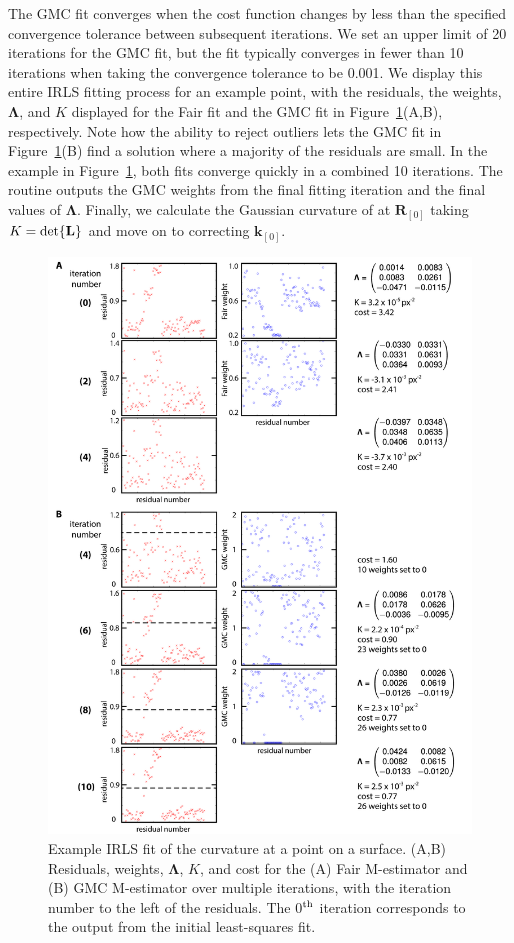 The GMC fit converges when the cost function changes by less than the specified convergence tolerance between subsequent iterations.
We set an upper limit of 20 iterations for the GMC fit, but the fit typically converges in fewer than 10 iterations when taking the convergence tolerance to be 0.001.
We display this entire IRLS fitting process for an example point, with the residuals, the weights, $\bm{\Lambda}$, and $K$ displayed for the Fair fit and the GMC fit in Figure~\ref{f:3-IRLSexample}(A,B), respectively.
Note how the ability to reject outliers lets the GMC fit in Figure~\ref{f:3-IRLSexample}(B) find a solution where a majority of the residuals are small.
In the example in Figure~\ref{f:3-IRLSexample}, both fits converge quickly in a combined 10 iterations.
The routine outputs the GMC weights from the final fitting iteration and the final values of $\bm{\Lambda}$.
Finally, we calculate the Gaussian curvature of at $\mathbf{R}_{[0]}$ taking $K = \textup{det}\{ \mathbf{L} \}$ and move on to correcting $\mathbf{k}_{[0]}$.
\begin{figure}[H]
  \centering
  \includegraphics[scale=0.95]{figures/C3/Ch3-Figs_IRLSexample.png}
  \caption{Example IRLS fit of the curvature at a point on a surface.
  (A,B) Residuals, weights, $\bm{\Lambda}$, $K$, and cost for the (A) Fair M-estimator and (B) GMC M-estimator over multiple iterations, with the iteration number to the left of the residuals.
  The 0$^{\rm th}$ iteration corresponds to the output from the initial least-squares fit.}\label{f:3-IRLSexample}
\end{figure}

